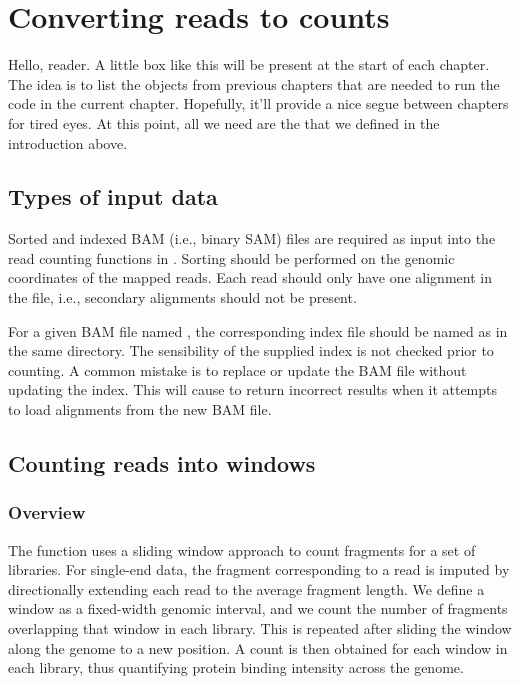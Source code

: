 \documentclass{report}\usepackage[]{graphicx}\usepackage[usenames,dvipsnames]{color}
\newenvironment{combox}
{ \definecolor{shadecolor}{RGB}{255, 240, 240} \begin{shaded}\begin{center}\begin{minipage}[t]{0.95\textwidth} }
{ \end{minipage}\end{center}\end{shaded} \definecolor{shadecolor}{RGB}{240,240,240} }
\begin{document}

\chapter{Converting reads to counts}
\label{chap:count}
\begin{combox}
Hello, reader.
A little box like this will be present at the start of each chapter.
The idea is to list the objects from previous chapters that are needed to run the code in the current chapter.
Hopefully, it'll provide a nice segue between chapters for tired eyes.
At this point, all we need are the  that we defined in the introduction above.
\end{combox}

\section{Types of input data}
Sorted and indexed BAM (i.e., binary SAM) files \cite{li2009} are required as input into the read counting functions in . 
Sorting should be performed on the genomic coordinates of the mapped reads.
Each read should only have one alignment in the file, i.e., secondary alignments should not be present.

For a given BAM file named , the corresponding index file should be named as  in the same directory. 
The sensibility of the supplied index is not checked prior to counting. 
A common mistake is to replace or update the BAM file without updating the index. 
This will cause  to return incorrect results when it attempts to load alignments from the new BAM file.

\section{Counting reads into windows}

\subsection{Overview}
The  function uses a sliding window approach to count fragments for a set of libraries. 
For single-end data, the fragment corresponding to a read is imputed by directionally extending each read to the average fragment length. 
We define a window as a fixed-width genomic interval, and we count the number of fragments overlapping that window in each library.
This is repeated after sliding the window along the genome to a new position. 
A count is then obtained for each window in each library, thus quantifying protein binding intensity across the genome.
\end{document}
